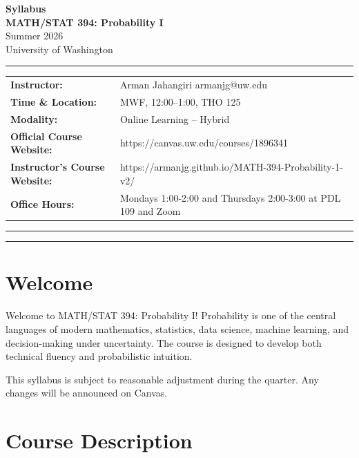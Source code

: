 \documentclass[11pt]{article}
\begin{document}
\begin{center}
    {\Large \bfseries Syllabus}\\[12pt]
    {\Large \bfseries MATH/STAT 394: Probability I}\\[3pt]
      {\Large  Summer 2026}\\[3pt]
    {\large University of Washington}\\[3pt]

\end{center}

\noindent
\rule{\textwidth}{0.4pt}

\vspace{0.5em}

\noindent
\renewcommand{\arraystretch}{1.4}
\begin{tabular}{@{}>{\bfseries}l l@{}}
Instructor: & Arman Jahangiri \quad armanjg@uw.edu \\[2pt]
Time \& Location: & MWF, 12:00--1:00, THO 125 \\[2pt]
Modality: & Online Learning -- Hybrid \\[2pt]
Official Course Website: & https://canvas.uw.edu/courses/1896341 \\[2pt]
Instructor's Course Website: & https://armanjg.github.io/MATH-394-Probability-1-v2/ \\[2pt]


Office Hours: & Mondays 1:00-2:00 and Thursdays 2:00-3:00 at PDL 109 and Zoom
\end{tabular}

\rule{\textwidth}{0.4pt}

\tableofcontents
\vspace{3mm}
\hrule

\section{Welcome}

Welcome to MATH/STAT 394: Probability I! Probability is one of the central languages of modern mathematics, statistics, data science, machine learning, and decision-making under uncertainty. The course is designed to develop both technical fluency and probabilistic intuition.

This syllabus is subject to reasonable adjustment during the quarter. Any changes will be announced on Canvas.

\section{Course Description}
\end{document}
